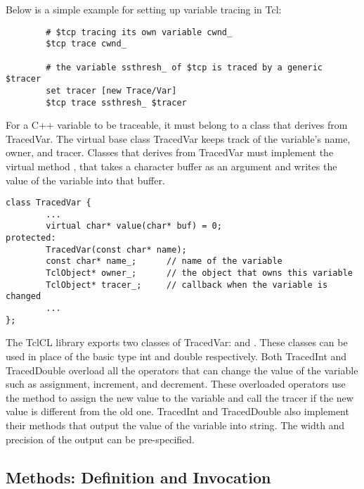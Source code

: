 Below is a simple example for setting up variable tracing in Tcl:

\begin{small}
\begin{verbatim}
        # $tcp tracing its own variable cwnd_
        $tcp trace cwnd_

        # the variable ssthresh_ of $tcp is traced by a generic $tracer
        set tracer [new Trace/Var]
        $tcp trace ssthresh_ $tracer
\end{verbatim}
\end{small}

For a C++ variable to be traceable, it must belong to a class that
derives from TracedVar.  The virtual base class TracedVar keeps track of
the variable's name, owner, and tracer.  Classes that derives from
TracedVar must implement the virtual method , that takes a
character buffer as an argument and writes the value of the variable
into that buffer.

\begin{small}
\begin{verbatim}
class TracedVar {
        ...
        virtual char* value(char* buf) = 0;
protected:
        TracedVar(const char* name);
        const char* name_;      // name of the variable
        TclObject* owner_;      // the object that owns this variable
        TclObject* tracer_;     // callback when the variable is changed
        ...
};
\end{verbatim}
\end{small}

The TclCL library exports two classes of TracedVar:   and
.  These classes can be used in place of the basic
type int and double respectively.  Both TracedInt and TracedDouble
overload all the operators that can change the value of the variable
such as assignment, increment, and decrement.  These overloaded
operators use the  method to assign the new value to the
variable and call the tracer if the new value is different from the old
one.  TracedInt and TracedDouble also implement their 
methods that output the value of the variable into string.  The width
and precision of the output can be pre-specified.

\subsection{ Methods: Definition and Invocation}
\label{sec:Commands}

